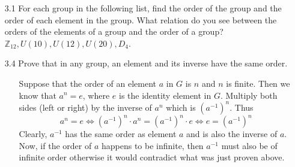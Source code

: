 \documentclass[12pt]{article}
\begin{document}
\begin{enumerate}
\item[3.1] For each group in the following list, find the order of the group and
the order of each element in the group. What relation do you see between the orders
of the elements of a group and the order of a  group? 
$\mathbb{Z}_{12}, U(10), U(12), U(20), D_4$.


\item[3.4] Prove that in any group, an element and its inverse have the same order.
\begin{enumerate}
\item[] Suppose that the order of an element $a$ in $G$ is $n$ and $n$ is finite. Then we know
that $a^n = e$, where $e$ is the identity element in $G$. Multiply both sides (left or right)
by the inverse of $a^n$ which is $(a^{-1})^n$. Thus 
\[ a^n = e \Leftrightarrow (a^{-1})^n \cdot a^n = (a^{-1})^n \cdot e \Leftrightarrow e 
= (a^{-1})^n \]
Clearly, $a^{-1}$ has the same order as element $a$ and is also the inverse of $a$. Now, 
if the order of $a$ happens to be infinite, then $a^{-1}$ must also be of infinite order
otherwise it would contradict what was just proven above.
\end{enumerate}


\end{enumerate}
\end{document}
